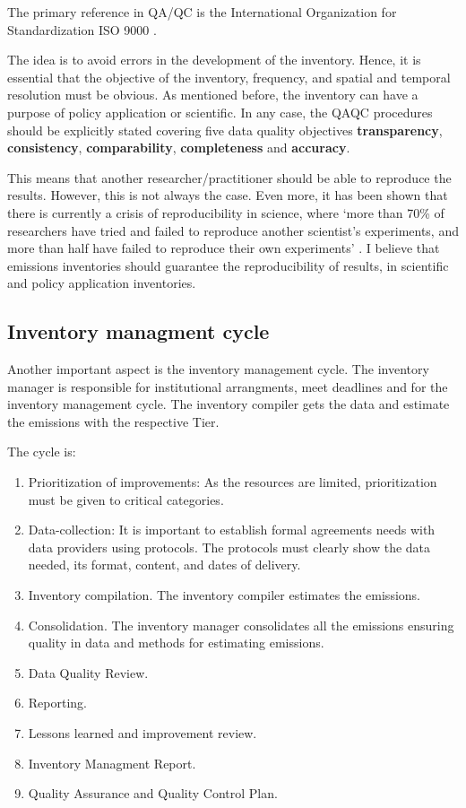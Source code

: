 \documentclass[12pt,graybox,envcountchap,sectrefs]{krantz}
\providecommand{\tightlist}{%
  \setlength{\itemsep}{0pt}\setlength{\parskip}{0pt}}
\theoremstyle{definition}
\theoremstyle{definition}
\theoremstyle{definition}
\theoremstyle{remark}
\begin{document}
The primary reference in QA/QC is the International Organization for
Standardization ISO 9000 \citep{wiki:iso}.

The idea is to avoid errors in the development of the inventory. Hence,
it is essential that the objective of the inventory, frequency, and
spatial and temporal resolution must be obvious. As mentioned before,
the inventory can have a purpose of policy application or scientific. In
any case, the QAQC procedures should be explicitly stated covering five
data quality objectives \textbf{transparency}, \textbf{consistency},
\textbf{comparability}, \textbf{completeness} and \textbf{accuracy}.

This means that another researcher/practitioner should be able to
reproduce the results. However, this is not always the case. Even more,
it has been shown that there is currently a crisis of reproducibility in
science, where `more than 70\% of researchers have tried and failed to
reproduce another scientist's experiments, and more than half have
failed to reproduce their own experiments' \citep{baker2016there}. I
believe that emissions inventories should guarantee the reproducibility
of results, in scientific and policy application inventories.

\subsection{Inventory managment cycle}\label{inventory-managment-cycle}

Another important aspect is the inventory management cycle. The
inventory manager is responsible for institutional arrangments, meet
deadlines and for the inventory management cycle. The inventory compiler
gets the data and estimate the emissions with the respective Tier.

The cycle is:

\begin{enumerate}
\def\labelenumi{\arabic{enumi}.}
\tightlist
\item
  Prioritization of improvements: As the resources are limited,
  prioritization must be given to critical categories.
\item
  Data-collection: It is important to establish formal agreements needs
  with data providers using protocols. The protocols must clearly show
  the data needed, its format, content, and dates of delivery.
\item
  Inventory compilation. The inventory compiler estimates the emissions.
\item
  Consolidation. The inventory manager consolidates all the emissions
  ensuring quality in data and methods for estimating emissions.
\item
  Data Quality Review.
\item
  Reporting.
\item
  Lessons learned and improvement review.
\item
  Inventory Managment Report.
\item
  Quality Assurance and Quality Control Plan.
\end{enumerate}
\end{document}
